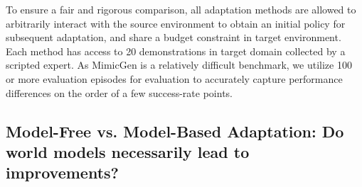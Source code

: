 \documentclass{article} %
\begin{document}
To ensure a fair and rigorous comparison, all adaptation methods are allowed to arbitrarily interact with the source environment to obtain an initial policy for subsequent adaptation, and share a budget constraint in target environment. Each method has access to 20 demonstrations in target domain collected by a scripted expert. As MimicGen is a relatively difficult benchmark, we utilize 100 or more evaluation episodes for evaluation to accurately capture performance differences on the order of a few success-rate points.

\subsection{Model-Free vs. Model-Based Adaptation: Do world models necessarily lead to improvements?}
\label{sec:mf-vs-mb}
\end{document}
